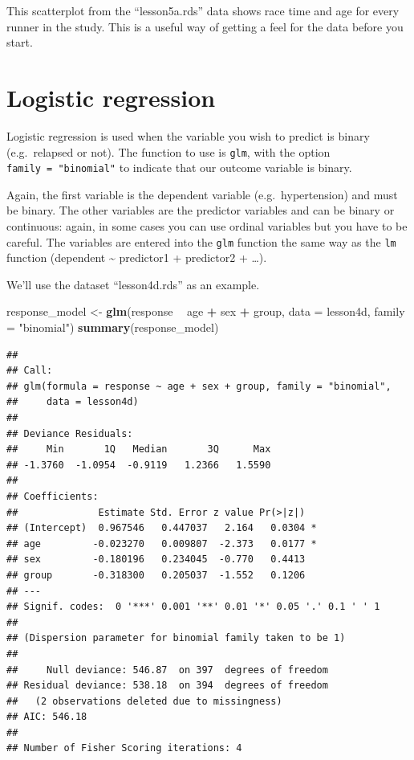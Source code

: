 \documentclass[]{book}
\newenvironment{Shaded}{\begin{snugshade}}{\end{snugshade}}
\newcommand{\DataTypeTok}[1]{\textcolor[rgb]{0.13,0.29,0.53}{#1}}
\newcommand{\KeywordTok}[1]{\textcolor[rgb]{0.13,0.29,0.53}{\textbf{#1}}}
\newcommand{\NormalTok}[1]{#1}
\newcommand{\OperatorTok}[1]{\textcolor[rgb]{0.81,0.36,0.00}{\textbf{#1}}}
\newcommand{\StringTok}[1]{\textcolor[rgb]{0.31,0.60,0.02}{#1}}
\begin{document}
This scatterplot from the ``lesson5a.rds'' data shows race time and age
for every runner in the study. This is a useful way of getting a feel
for the data before you start.

\hypertarget{logistic-regression}{%
\section{Logistic regression}\label{logistic-regression}}

Logistic regression is used when the variable you wish to predict is
binary (e.g.~relapsed or not). The function to use is \texttt{glm}, with
the option \texttt{family\ =\ "binomial"} to indicate that our outcome
variable is binary.

Again, the first variable is the dependent variable (e.g.~hypertension)
and must be binary. The other variables are the predictor variables and
can be binary or continuous: again, in some cases you can use ordinal
variables but you have to be careful. The variables are entered into the
\texttt{glm} function the same way as the \texttt{lm} function
(dependent \textasciitilde{} predictor1 + predictor2 + \ldots).

We'll use the dataset ``lesson4d.rds'' as an example.

\begin{Shaded}
\begin{Highlighting}[]
\NormalTok{response_model <-}\StringTok{ }\KeywordTok{glm}\NormalTok{(response }\OperatorTok{~}\StringTok{ }\NormalTok{age }\OperatorTok{+}\StringTok{ }\NormalTok{sex }\OperatorTok{+}\StringTok{ }\NormalTok{group, }\DataTypeTok{data =}\NormalTok{ lesson4d, }\DataTypeTok{family =} \StringTok{"binomial"}\NormalTok{)}
\KeywordTok{summary}\NormalTok{(response_model)}
\end{Highlighting}
\end{Shaded}

\begin{verbatim}
## 
## Call:
## glm(formula = response ~ age + sex + group, family = "binomial", 
##     data = lesson4d)
## 
## Deviance Residuals: 
##     Min       1Q   Median       3Q      Max  
## -1.3760  -1.0954  -0.9119   1.2366   1.5590  
## 
## Coefficients:
##              Estimate Std. Error z value Pr(>|z|)  
## (Intercept)  0.967546   0.447037   2.164   0.0304 *
## age         -0.023270   0.009807  -2.373   0.0177 *
## sex         -0.180196   0.234045  -0.770   0.4413  
## group       -0.318300   0.205037  -1.552   0.1206  
## ---
## Signif. codes:  0 '***' 0.001 '**' 0.01 '*' 0.05 '.' 0.1 ' ' 1
## 
## (Dispersion parameter for binomial family taken to be 1)
## 
##     Null deviance: 546.87  on 397  degrees of freedom
## Residual deviance: 538.18  on 394  degrees of freedom
##   (2 observations deleted due to missingness)
## AIC: 546.18
## 
## Number of Fisher Scoring iterations: 4
\end{verbatim}
\end{document}
